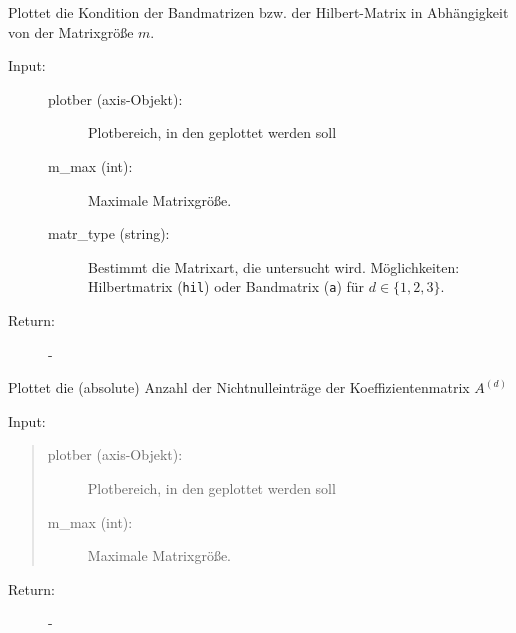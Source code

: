 \documentclass[letterpaper,10pt,ngerman, oneside, openright]{sphinxmanual}
\begin{document}
\begin{fulllineitems}
\label{\detokenize{index:aufg_3_4_main.plot_kond}}
Plottet die Kondition der Bandmatrizen bzw. der Hilbert-Matrix in Abhängigkeit von der
Matrixgröße $m$.

\begin{description}
\item[{Input:}] \leavevmode

\begin{description}
\item[{plotber (axis-Objekt):}] \leavevmode
Plotbereich, in den geplottet werden soll

\item[{m\_max (int):}] \leavevmode
Maximale Matrixgröße.

\item[{matr\_type (string):}] \leavevmode
Bestimmt die Matrixart, die untersucht wird.
Möglichkeiten: Hilbertmatrix (\texttt{hil}) oder
Bandmatrix (\texttt{a}) für $d\in\{1,2,3\}$.

\end{description}
\end{description}
\begin{description}
\item [{Return:}] -
\end{description}
\end{fulllineitems}


\begin{fulllineitems}
\label{\detokenize{index:aufg_3_4_main.plot_nn}}
Plottet die (absolute) Anzahl der Nichtnulleinträge der Koeffizientenmatrix $A^{(d)}$

Input:
\begin{quote}
\begin{description}
\item[{plotber (axis-Objekt):}] \leavevmode
Plotbereich, in den geplottet werden soll

\item[{m\_max (int):}] \leavevmode
Maximale Matrixgröße.

\end{description}
\end{quote}
\begin{description}
\item [{Return:}] -
\end{description}
\end{fulllineitems}
\end{document}
